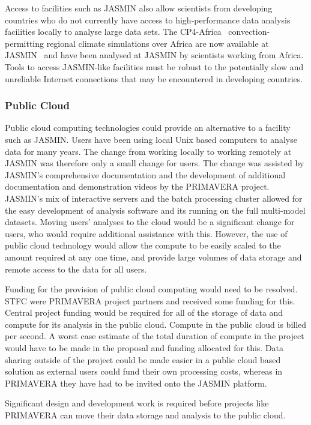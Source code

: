 \documentclass[gmd, manuscript]{copernicus}
\begin{document}
Access to facilities such as JASMIN also allow scientists from developing countries who do not currently have access to high-performance data analysis facilities locally to analyse large data sets. The CP4-Africa~\citep{Stratton2018} convection-permitting regional climate simulations over Africa are now available at JASMIN~\citep{Senior2019} and have been analysed at JASMIN by scientists working from Africa. Tools to access JASMIN-like facilities must be robust to the potentially slow and unreliable Internet connections that may be encountered in developing countries.


\subsubsection{Public Cloud}
Public cloud computing technologies could provide an alternative to a facility such as JASMIN. Users have been using local Unix based computers to analyse data for many years. The change from working locally to working remotely at JASMIN was therefore only a small change for users. The change was assisted by JASMIN's comprehensive documentation and the development of additional documentation and demonstration videos by the PRIMAVERA project. JASMIN's mix of interactive servers and the batch processing cluster allowed for the easy development of analysis software and its running on the full multi-model datasets. Moving users' analyses to the cloud would be a significant change for users, who would require additional assistance with this. However, the use of public cloud technology would allow the compute to be easily scaled to the amount required at any one time, and provide large volumes of data storage and remote access to the data for all users.

Funding for the provision of public cloud computing would need to be resolved. STFC were PRIMAVERA project partners and received some funding for this. Central project funding would be required for all of the storage of data and compute for its analysis in the public cloud. Compute in the public cloud is billed per second. A worst case estimate of the total duration of compute in the project would have to be made in the proposal and funding allocated for this. Data sharing outside of the project could be made easier in a public cloud based solution as external users could fund their own processing costs, whereas in PRIMAVERA they have had to be invited onto the JASMIN platform.

Significant design and development work is required before projects like PRIMAVERA can move their data storage and analysis to the public cloud.
\end{document}
